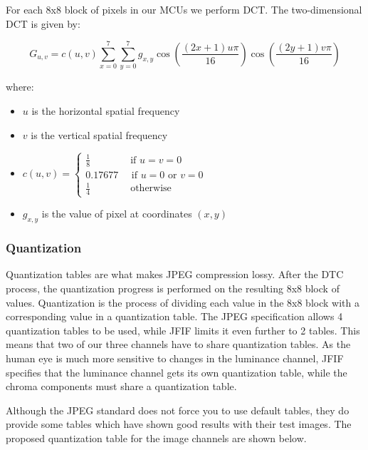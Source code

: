 \begin{infobox}
For each 8x8 block of pixels in our MCUs we perform DCT. The two-dimensional DCT is given by:

$$ G_{u,v} = c(u,v)\sum_{x=0}^{7}\sum_{y=0}^{7}g_{x,y}\cos{\left(\frac{(2x+1)u\pi}{16}\right)}\cos{\left(\frac{(2y+1)v\pi}{16}\right)} $$

where:
\begin{itemize}
	\item $u$ is the horizontal spatial frequency 
	\item $v$ is the vertical spatial frequency 
	\item $c(u,v) = \begin{cases}\frac{1}{8} \quad \quad \quad \quad\text{if } u=v=0\\ 
	                             0.17677 \quad \text{ if } u = 0 \text{ or } v = 0\\
	                             \frac{1}{4} \quad \quad \quad \quad\text{otherwise}
	                             \end{cases} $
    \item $g_{x,y}$ is the value of pixel at coordinates $(x,y)$ 
\end{itemize}

\vspace{4mm}
\subsubsection*{Quantization}
\vspace{-2.5mm}
Quantization tables are what makes JPEG compression lossy. 
After the DTC process, the quantization progress is performed on the resulting 8x8 block of values.
Quantization is the process of dividing each value in the 8x8 block with a corresponding value in a quantization table. 
The JPEG specification allows 4 quantization tables to be used, while JFIF limits it even further to 2 tables. 
This means that two of our three channels have to share quantization tables. 
As the human eye is much more sensitive to changes in the luminance channel, JFIF specifies that the luminance channel gets its own quantization table, while the chroma components must share a quantization table.

Although the JPEG standard does not force you to use default tables, they do provide some tables which have shown good results with their test images. The proposed quantization table for the image channels are shown below.


\end{infobox}
